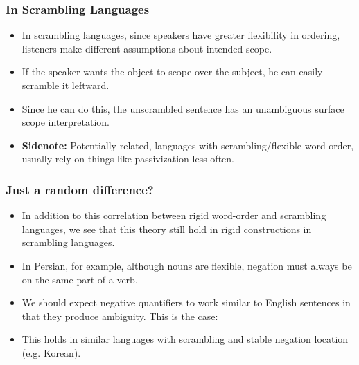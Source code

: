 \documentclass[aspectratio=1610]{beamer}
\begin{document}
\begin{frame}
\frametitle{In Scrambling Languages}\pause
\begin{itemize}
\item In scrambling languages, since speakers have greater flexibility in ordering, listeners make different assumptions about intended scope.\pause
\item If the speaker wants the object to scope over the subject, he can easily scramble it leftward.\pause
\item Since he can do this, the unscrambled sentence has an unambiguous surface scope interpretation.\pause
\item \textbf{Sidenote:} Potentially related, languages with scrambling/flexible word order, usually rely on things like passivization less often.
\end{itemize}
\end{frame}


\begin{frame}
\frametitle{Just a random difference?}\pause
\begin{itemize}
\item In addition to this correlation between rigid word-order and scrambling languages, we see that this theory still hold in rigid constructions in scrambling languages.\pause
\item In Persian, for example, although nouns are flexible, negation must always be on the same part of a verb.\pause
\item We should expect negative quantifiers to work similar to English sentences in that they produce ambiguity. This is the case:\pause
\begin{exe}
\end{exe}\pause
\item This holds in similar languages with scrambling and stable negation location (e.g. Korean).

\end{itemize}
\end{frame}
\end{document}

